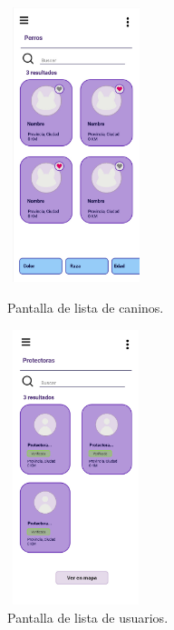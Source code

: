 \documentclass[a4paper, 12pt]{article}
\begin{document}
\begin{figure}[H]
   	\begin{minipage}{0.48\textwidth}
		\begin{center}
			{\includegraphics[height=8cm, width=4cm]{design/DogList.jpg}\par}
			\caption{Pantalla de lista de caninos.}
			\medskip
		\end{center}  
	\end{minipage}\hfill
   	\begin{minipage}{0.48\textwidth}
		\begin{center}
			{\includegraphics[height=8cm, width=4cm]{design/UserList.jpg}\par}
			\caption{Pantalla de lista de usuarios.}
			\medskip
		\end{center}  
	\end{minipage}\hfill
\end{figure}
\end{document}
